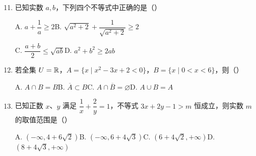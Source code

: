 \documentclass[a4paper,11pt]{article}
\begin{document}
\begin{enumerate}
\setcounter{enumi}{10}

\item 已知实数 $a,b$，下列四个不等式中正确的是\mbox{（\quad）}

\keepwithprev
A. $a+\dfrac1a\geqslant2$\qquad B. $\sqrt{a^2+2}+\dfrac{1}{\sqrt{a^2+2}}\geqslant2$

C. $\dfrac{a+b}{2}\leqslant\sqrt{ab}$\qquad D. $a^2+b^2\geqslant2ab$

\ifanswer
{}
\fi

\item 若全集 $U=\mathbb{R}$，$A=\{x\mid x^2-3x+2<0\}$，$B=\{x\mid0<x<6\}$，则\mbox{（\quad）}

\keepwithprev
A. $A\cap B=B$\qquad B. $\overline{A}\subset B$\qquad C. $A\cap\overline{B}=\varnothing$\qquad D. $A\cup B=A$

\ifanswer
\solbegin
{}
\step{$\overline{A}=(-\infty,1]\cup[2,+\infty)\not\subset B$，$B$ 错误;}
\step{$\overline{B}=(-\infty,0]\cup[6,+\infty)$，所以 $A\cap\overline{B}=\varnothing,C$ 正确;}
\solend
\fi

\item 已知正数 $x$、$y$ 满足 $\dfrac1x+\dfrac2y=1$，不等式 $3x+2y-1>m$ 恒成立，则实数 $m$ 的取值范围是\mbox{（\quad）}

\keepwithprev
A. $(-\infty,4+6\sqrt2)$\qquad B. $(-\infty,6+4\sqrt3)$\qquad C. $(6+4\sqrt2,+\infty)$\qquad D. $(8+4\sqrt3,+\infty)$

\ifanswer
\solbegin
{}
\solend
\fi

\end{enumerate}

\end{document}
